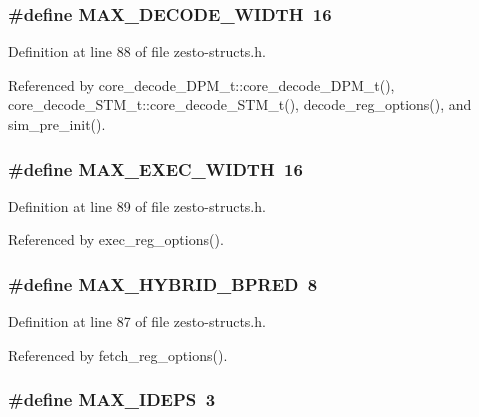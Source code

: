 \subsubsection[{MAX\_\-DECODE\_\-WIDTH}]{\setlength{\rightskip}{0pt plus 5cm}\#define MAX\_\-DECODE\_\-WIDTH~16}\label{zesto-structs_8h_7925458602fb09113662210a6e857332}




Definition at line 88 of file zesto-structs.h.

Referenced by core\_\-decode\_\-DPM\_\-t::core\_\-decode\_\-DPM\_\-t(), core\_\-decode\_\-STM\_\-t::core\_\-decode\_\-STM\_\-t(), decode\_\-reg\_\-options(), and sim\_\-pre\_\-init().
\subsubsection[{MAX\_\-EXEC\_\-WIDTH}]{\setlength{\rightskip}{0pt plus 5cm}\#define MAX\_\-EXEC\_\-WIDTH~16}\label{zesto-structs_8h_ac526a8d857ac36c3ac601b501c21506}




Definition at line 89 of file zesto-structs.h.

Referenced by exec\_\-reg\_\-options().
\subsubsection[{MAX\_\-HYBRID\_\-BPRED}]{\setlength{\rightskip}{0pt plus 5cm}\#define MAX\_\-HYBRID\_\-BPRED~8}\label{zesto-structs_8h_eb66d81b791730891fcb9ffbebcc1015}




Definition at line 87 of file zesto-structs.h.

Referenced by fetch\_\-reg\_\-options().
\subsubsection[{MAX\_\-IDEPS}]{\setlength{\rightskip}{0pt plus 5cm}\#define MAX\_\-IDEPS~3}\label{zesto-structs_8h_dfffbd8f2596b46b6777c263be9e5a23}




